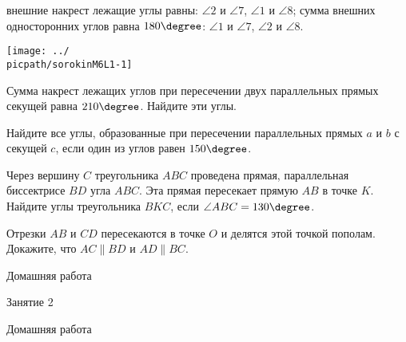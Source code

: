 \begin{class}[number=1]
\begin{definit}
\begin{tasks}
			\task внешние накрест лежащие углы равны: \( \angle 2 \) и \( \angle 7 \), \( \angle 1 \) и \( \angle 8 \);
			\task сумма внешних односторонних углов равна  \(180\degree\): \( \angle 1 \) и \( \angle 7 \), \( \angle 2 \) и \( \angle 8 \).
		\end{tasks}
	\begin{minipage}[c]{0.9\linewidth}
		\texttt{[image: ../\\picpath/sorokinM6L1-1]}
	\end{minipage}
	\end{definit}
	\begin{listofex}[resume]
		\item Сумма накрест лежащих углов при пересечении двух параллельных прямых секущей равна \(210 \degree \). Найдите эти углы.
		\item Найдите все углы, образованные при пересечении параллельных прямых \(a\) и \(b\) с секущей \(c\), если один из углов равен \( 150 \degree \).
		\item Через вершину \(C\) треугольника \(ABC\) проведена прямая, параллельная биссектрисе \(BD\) угла \(ABC\). Эта прямая пересекает прямую \(AB\) в точке \(K\). Найдите углы треугольника \(BKC\), если \(\angle ABC = 130 \degree\).
		\item Отрезки \(AB\) и \(CD\) пересекаются в точке \(O\) и делятся этой точкой пополам. Докажите, что \(AC \parallel BD\) и \(AD \parallel BC\).
		
	\end{listofex}
\end{class}

\begin{homework}[number=1]
	\begin{listofex}
		\item Домашняя работа
	\end{listofex}
\end{homework}

\begin{class}[number=2]
	\begin{listofex}
		\item Занятие 2
	\end{listofex}
\end{class}

\begin{homework}[number=2]
	\begin{listofex}
		\item Домашняя работа
	\end{listofex}
\end{homework}

